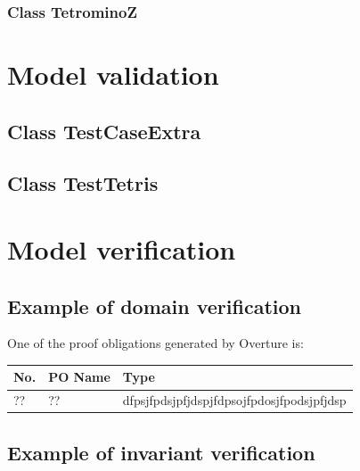 \documentclass[a4paper]{article}
\begin{document}


\subsubsection{Class TetrominoZ}



\section{Model validation}



\subsection{Class TestCaseExtra} 



\subsection{Class TestTetris} 



\section{Model verification}

\subsection{Example of domain verification} 

One of the proof obligations generated by Overture is:

\begin{table}[!h]
	\centering
	\label{domain-verification}
	\begin{tabular}{|l|l|p{8.5cm}|}
		\hline
		No.  & PO Name & Type	\\	\hline
		??   & ?? & dfpsjfpdsjpfjdspjfdpsojfpdosjfpodsjpfjdsp	\\	\hline
	\end{tabular}
\end{table}

\subsection{Example of invariant verification} 
\end{document}
